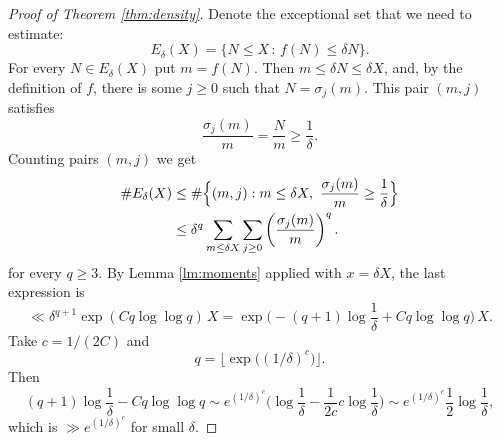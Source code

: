 \begin{proof}[Proof of Theorem \ref{thm:density}]
Denote the exceptional set that we need to estimate:
\[ E_\delta(X)=\{N\leq X \,:\, f(N)\leq \delta N\}. \]
For every $N\in E_\delta(X)$ put $m=f(N)$. Then $m\leq \delta N\leq \delta X$, and, by the definition of $f$, there is some
$j\geq 0$ such that $N=\sigma_j(m)$. This pair $(m,j)$ satisfies
\[ \frac{\sigma_j(m)}{m}=\frac{N}{m}\geq \frac1\delta. \]
Counting pairs $(m,j)$ we get
\begin{align*}
\# E_\delta(X) & \leq \#\Bigl\{(m,j):m\leq \delta X,\ \frac{\sigma_j(m)}{m}\geq \frac1\delta\Bigr\} \\
& \leq \delta^q \sum_{m\leq \delta X}\sum_{j\geq 0} \left(\frac{\sigma_j(m)}{m}\right)^q.
\end{align*}
for every $q\geq3$.
By Lemma \ref{lm:moments} applied with $x=\delta X$, the last expression is
\[ \ll \delta^{q+1} \exp(C q \log\log q) \, X 
= \exp\Big( -(q+1)\log\frac{1}{\delta} + C q \log\log q \Big) \, X. \]
Take $c=1/(2C)$ and
\[ q = \big\lfloor \exp \bigl( (1/\delta)^c \bigr) \big\rfloor. \]
Then
\[ (q+1)\log\frac{1}{\delta} - C q \log\log q 
\sim e^{(1/\delta)^c} \Big( \log\frac{1}{\delta} - \frac{1}{2c} c \log\frac{1}{\delta} \Big)
\sim e^{(1/\delta)^c} \frac12 \log\frac{1}{\delta}, \]
which is $\gg e^{(1/\delta)^c}$ for small $\delta$.
\end{proof}